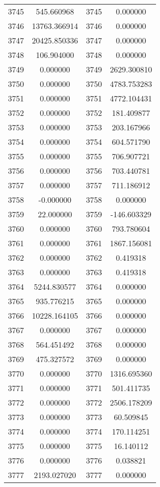 \documentclass[12pt]{article}
\begin{document}
\begin{longtable}{@{}cccc@{}}
3745 & 545.660968 & 3745 & 0.000000 \\
3746 & 13763.366914 & 3746 & 0.000000 \\
3747 & 20425.850336 & 3747 & 0.000000 \\
3748 & 106.904000 & 3748 & 0.000000 \\
3749 & 0.000000 & 3749 & 2629.300810 \\
3750 & 0.000000 & 3750 & 4783.753283 \\
3751 & 0.000000 & 3751 & 4772.104431 \\
3752 & 0.000000 & 3752 & 181.409877 \\
3753 & 0.000000 & 3753 & 203.167966 \\
3754 & 0.000000 & 3754 & 604.571790 \\
3755 & 0.000000 & 3755 & 706.907721 \\
3756 & 0.000000 & 3756 & 703.440781 \\
3757 & 0.000000 & 3757 & 711.186912 \\
3758 & -0.000000 & 3758 & 0.000000 \\
3759 & 22.000000 & 3759 & -146.603329 \\
3760 & 0.000000 & 3760 & 793.780604 \\
3761 & 0.000000 & 3761 & 1867.156081 \\
3762 & 0.000000 & 3762 & 0.419318 \\
3763 & 0.000000 & 3763 & 0.419318 \\
3764 & 5244.830577 & 3764 & 0.000000 \\
3765 & 935.776215 & 3765 & 0.000000 \\
3766 & 10228.164105 & 3766 & 0.000000 \\
3767 & 0.000000 & 3767 & 0.000000 \\
3768 & 564.451492 & 3768 & 0.000000 \\
3769 & 475.327572 & 3769 & 0.000000 \\
3770 & 0.000000 & 3770 & 1316.695360 \\
3771 & 0.000000 & 3771 & 501.411735 \\
3772 & 0.000000 & 3772 & 2506.178209 \\
3773 & 0.000000 & 3773 & 60.509845 \\
3774 & 0.000000 & 3774 & 170.114251 \\
3775 & 0.000000 & 3775 & 16.140112 \\
3776 & 0.000000 & 3776 & 0.038821 \\
3777 & 2193.027020 & 3777 & 0.000000 \\

\end{longtable}
\end{document}
